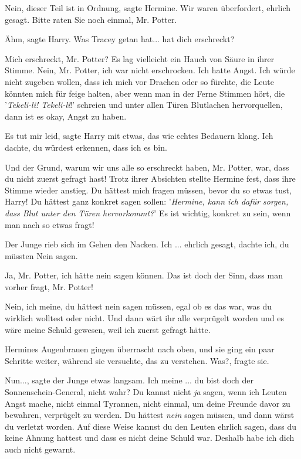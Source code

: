 \glqq{}Nein, dieser Teil ist in Ordnung\grqq{}, sagte Hermine. \glqq{}Wir waren
überfordert, ehrlich gesagt. Bitte raten Sie noch einmal, Mr. Potter.\grqq{}

\glqq{}Ähm\grqq{}, sagte Harry. \glqq{}Was Tracey getan hat... hat dich
erschreckt?\grqq{}

\glqq{}Mich erschreckt, Mr. Potter?\grqq{} Es lag vielleicht ein Hauch von Säure
in ihrer Stimme. \glqq{}Nein, Mr. Potter, ich war nicht erschrocken. Ich hatte
Angst. Ich würde nicht zugeben wollen, dass ich mich vor Drachen oder so
fürchte, die Leute könnten mich für feige halten, aber wenn man in der Ferne
Stimmen hört, die '\emph{Tekeli-li! Tekeli-li}!' schreien und unter allen Türen
Blutlachen hervorquellen, dann ist es okay, Angst zu haben.\grqq{}

\glqq{}Es tut mir leid\grqq{}, sagte Harry mit etwas, das wie echtes Bedauern
klang. \glqq{}Ich dachte, du würdest erkennen, dass ich es bin.\grqq{}

\glqq{}Und der Grund, warum wir uns alle so erschreckt haben, Mr. Potter, war,
dass du nicht zuerst gefragt hast!\grqq{} Trotz ihrer Absichten stellte Hermine
fest, dass ihre Stimme wieder anstieg. \glqq{}Du hättest mich fragen müssen,
bevor du so etwas tust, Harry! Du hättest ganz konkret sagen sollen:
'\emph{Hermine, kann ich dafür sorgen, dass Blut unter den Türen hervorkommt?}'
Es ist wichtig, konkret zu sein, wenn man nach so etwas fragt!\grqq{}

Der Junge rieb sich im Gehen den Nacken. \glqq{}Ich ... ehrlich gesagt, dachte
ich, du müssten Nein sagen.\grqq{}

\glqq{}Ja, Mr. Potter, ich hätte nein sagen können. Das ist doch der Sinn, dass
man vorher fragt, Mr. Potter!\grqq{}

\glqq{}Nein, ich meine, du hättest nein sagen müssen, egal ob es das war, was du
wirklich wolltest oder nicht. Und dann wärt ihr alle verprügelt worden und es
wäre meine Schuld gewesen, weil ich zuerst gefragt hätte.\grqq{}

Hermines Augenbrauen gingen überrascht nach oben, und sie ging ein paar Schritte
weiter, während sie versuchte, das zu verstehen. \glqq{}Was?\grqq{}, fragte sie.

\glqq{}Nun...\grqq{}, sagte der Junge etwas langsam. \glqq{}Ich meine ... du bist
doch der Sonnenschein-General, nicht wahr? Du kannst nicht \emph{ja} sagen, wenn
ich Leuten Angst mache, nicht einmal Tyrannen, nicht einmal, um deine Freunde
davor zu bewahren, verprügelt zu werden. Du hättest \emph{nein} sagen müssen,
und dann wärst du verletzt worden. Auf diese Weise kannst du den Leuten ehrlich
sagen, dass du keine Ahnung hattest und dass es nicht deine Schuld war. Deshalb
habe ich dich auch nicht gewarnt.\grqq{}

